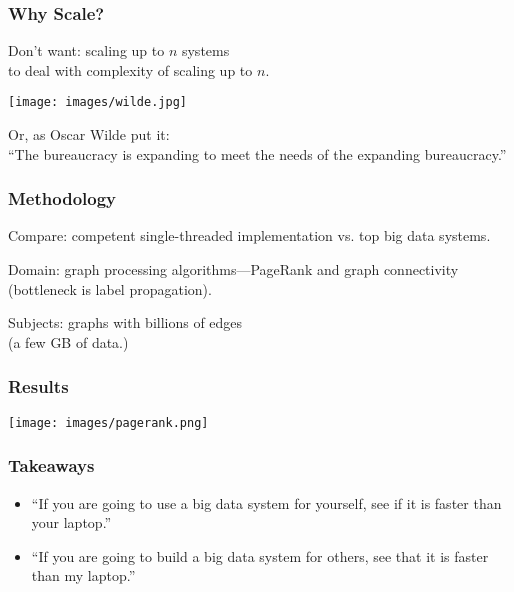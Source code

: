 \begin{frame}
\frametitle{Why Scale?}


\begin{changemargin}{1cm}
Don't want: scaling up to $n$ systems \\
to deal with complexity of scaling up to $n$.\\[1em]

\begin{center}
	\texttt{[image: images/wilde.jpg]}
\end{center}

Or, as Oscar Wilde put it: \\
``The bureaucracy is expanding to meet the needs of the expanding bureaucracy.''
\end{changemargin}
\end{frame}



\begin{frame}
\frametitle{Methodology}


\begin{changemargin}{1cm}
Compare: competent single-threaded implementation vs. top
big data systems. 

Domain: graph processing
algorithms---PageRank and graph connectivity \\
(bottleneck is label propagation). 

Subjects: graphs with billions of edges\\
(a few
GB of data.)
\end{changemargin}

\end{frame}



\begin{frame}
\frametitle{Results}

\begin{center}
	\texttt{[image: images/pagerank.png]}
\end{center}


\end{frame}



\begin{frame}
\frametitle{Takeaways}


\begin{changemargin}{1cm}

\begin{itemize}
\item    ``If you are going to use a big data system for yourself, see if it is faster than your laptop.''\\[1em]
\item    ``If you are going to build a big data system for others, see that it is faster than my laptop.''
\end{itemize}

\end{changemargin}
\end{frame}




